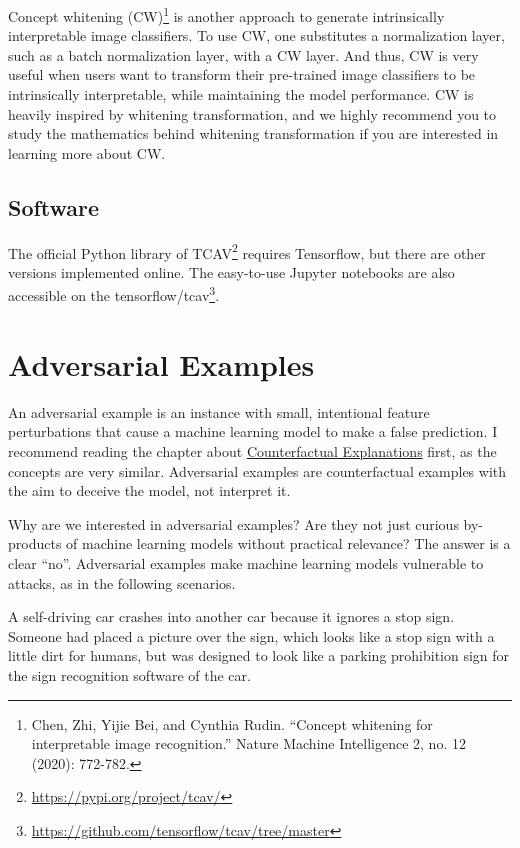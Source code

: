\documentclass[
  11pt,
]{scrbook}
\renewcommand{\href}[2]{#2\footnote{\url{#1}}}
\begin{document}
Concept whitening (CW)\footnote{Chen, Zhi, Yijie Bei, and Cynthia Rudin. ``Concept whitening for interpretable image recognition.'' Nature Machine Intelligence 2, no. 12 (2020): 772-782.} is another approach to generate intrinsically interpretable image classifiers.
To use CW, one substitutes a normalization layer, such as a batch normalization layer, with a CW layer.
And thus, CW is very useful when users want to transform their pre-trained image classifiers to be intrinsically interpretable, while maintaining the model performance.
CW is heavily inspired by whitening transformation, and we highly recommend you to study the mathematics behind whitening transformation if you are interested in learning more about CW.

\hypertarget{software-7}{%
\subsection{Software}\label{software-7}}

The official Python library of \href{https://pypi.org/project/tcav/}{TCAV} requires Tensorflow, but there are other versions implemented online.
The easy-to-use Jupyter notebooks are also accessible on the \href{https://github.com/tensorflow/tcav/tree/master}{tensorflow/tcav}.

\newpage

\hypertarget{adversarial}{%
\section{Adversarial Examples}\label{adversarial}}

An adversarial example is an instance with small, intentional feature perturbations that cause a machine learning model to make a false prediction.
I recommend reading the chapter about \protect\hyperlink{counterfactual}{Counterfactual Explanations} first, as the concepts are very similar.
Adversarial examples are counterfactual examples with the aim to deceive the model, not interpret it.

Why are we interested in adversarial examples?
Are they not just curious by-products of machine learning models without practical relevance?
The answer is a clear ``no''.
Adversarial examples make machine learning models vulnerable to attacks, as in the following scenarios.

A self-driving car crashes into another car because it ignores a stop sign.
Someone had placed a picture over the sign, which looks like a stop sign with a little dirt for humans, but was designed to look like a parking prohibition sign for the sign recognition software of the car.
\end{document}
